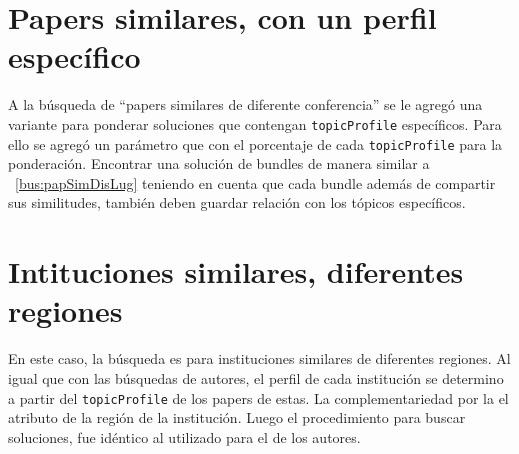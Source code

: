 \section{Papers similares, con un perfil específico}
A la búsqueda de ``papers similares de diferente conferencia'' se le agregó una variante para ponderar
soluciones que contengan \texttt{topicProfile} específicos.
Para ello se agregó un parámetro que con el porcentaje de cada \texttt{topicProfile} para la ponderación.
Encontrar una solución de bundles de manera similar a ~\ref{bus:papSimDisLug} teniendo en cuenta que cada 
bundle además de compartir sus similitudes, también deben guardar relación con los tópicos 
específicos.\\
\section{Intituciones similares, diferentes regiones}
En este caso, la búsqueda es para instituciones similares de diferentes regiones. Al igual que con las 
búsquedas de autores, el perfil de cada institución se determino a partir del \texttt{topicProfile} de los papers
de estas. La complementariedad por la el atributo de la región de la institución. 
Luego el procedimiento para buscar soluciones, fue idéntico al utilizado para el de los autores.
